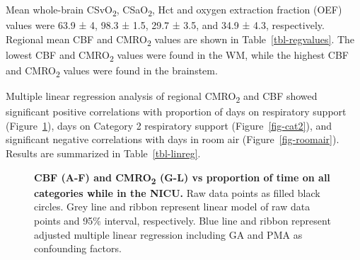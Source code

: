 \documentclass[
  letterpaper,
  DIV=11,
  numbers=noendperiod]{scrartcl}
\begin{document}
Mean whole-brain CSvO\textsubscript{2}, CSaO\textsubscript{2}, Hct and
oxygen extraction fraction (OEF) values were 63.9 ± 4, 98.3 ± 1.5, 29.7
± 3.5, and 34.9 ± 4.3, respectively. Regional mean CBF and
CMRO\textsubscript{2} values are shown in Table~\ref{tbl-regvalues}. The
lowest CBF and CMRO\textsubscript{2} values were found in the WM, while
the highest CBF and CMRO\textsubscript{2} values were found in the
brainstem.

Multiple linear regression analysis of regional CMRO\textsubscript{2}
and CBF showed significant positive correlations with proportion of days
on respiratory support (Figure~\ref{fig-proportion}), days on Category 2
respiratory support (Figure~\ref{fig-cat2}), and significant negative
correlations with days in room air (Figure~\ref{fig-roomair}). Results
are summarized in Table~\ref{tbl-linreg}.

\begin{figure}


\caption{\label{fig-proportion}\textbf{CBF (A-F) and
CMRO\textsubscript{2} (G-L) vs proportion of time on all categories
while in the NICU.} Raw data points as filled black circles. Grey line
and ribbon represent linear model of raw data points and 95\% interval,
respectively. Blue line and ribbon represent adjusted multiple linear
regression including GA and PMA as confounding factors.}

\end{figure}%
\end{document}
